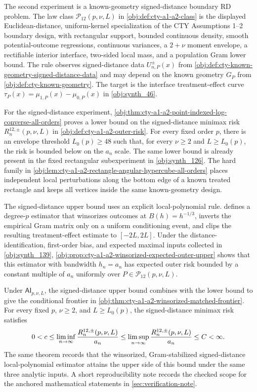 The second experiment is a known-geometry signed-distance boundary RD problem. The law class \(\mathcal P_{12}(p,\nu,L)\) in \cref{obj:def:cty-a1-a2-class} is the displayed Euclidean-distance, uniform-kernel specialization of the CTY Assumptions 1--2 boundary design, with rectangular support, bounded continuous density, smooth potential-outcome regressions, continuous variances, a \(2+\nu\) moment envelope, a rectifiable interior interface, two-sided local mass, and a population Gram lower bound. The rule observes signed-distance data \(U^{\pm}_{n,P}(x)\) from \cref{obj:def:cty-known-geometry-signed-distance-data} and may depend on the known geometry \(G_P\) from \cref{obj:def:cty-known-geometry}. The target is the interface treatment-effect curve \(\tau_P(x)=\mu_{1,P}(x)-\mu_{0,P}(x)\) in \cref{obj:synth_46}.

For the signed-distance experiment, \cref{obj:thm:cty-a1-a2-point-indexed-log-converse-all-orders} proves a lower bound on the signed-distance minimax risk \(R_n^{12,\pm}(p,\nu,L)\) in \cref{obj:def:cty-a1-a2-outer-risk}. For every fixed order \(p\), there is an envelope threshold \(L_0(p)\ge48\) such that, for every \(\nu\ge2\) and \(L\ge L_0(p)\), the risk is bounded below on the \(a_n\) scale. The same lower bound is already present in the fixed rectangular subexperiment in \cref{obj:synth_126}. The hard family in \cref{obj:lem:cty-a1-a2-rectangle-angular-hypercube-all-orders} places independent local perturbations along the bottom edge of a known treated rectangle and keeps all vertices inside the same known-geometry design.

The signed-distance upper bound uses an explicit local-polynomial rule.  defines a degree-\(p\) estimator that winsorizes outcomes at \(B(h)=h^{-1/3}\), inverts the empirical Gram matrix only on a uniform conditioning event, and clips the resulting treatment-effect estimate to \([-2L,2L]\). Under the distance-identification, first-order bias, and expected maximal inputs collected in \cref{obj:synth_139}, \cref{obj:prop:cty-a1-a2-winsorized-expected-outer-upper} shows that this estimator with bandwidth \(h_n=a_n\) has expected outer risk bounded by a constant multiple of \(a_n\) uniformly over \(P\in\mathcal P_{12}(p,\nu,L)\).

Under \(\mathsf{AI}_{p,\nu,L}\), the signed-distance upper bound combines with the lower bound to give the conditional frontier in \cref{obj:thm:cty-a1-a2-winsorized-matched-frontier}. For every fixed \(p\), \(\nu\ge2\), and \(L\ge L_0(p)\), the signed-distance minimax risk satisfies
\[
0<c
\le
\liminf_{n\to\infty}{R_n^{12,\pm}(p,\nu,L)\over a_n}
\le
\limsup_{n\to\infty}{R_n^{12,\pm}(p,\nu,L)\over a_n}
\le C<\infty.
\]
The same theorem records that the winsorized, Gram-stabilized signed-distance local-polynomial estimator attains the upper side of this bound under the same three analytic inputs. A short reproducibility note records the checked scope for the anchored mathematical statements in \cref{sec:verification-note}.

